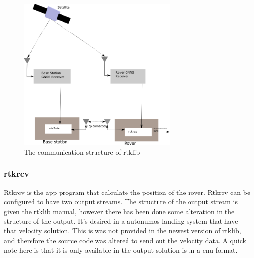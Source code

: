 \begin{figure}[H]
	\centering
		\includegraphics[width=0.7\textwidth]{figs/Rtklib_structure.png}
		\caption{The communication structure of rtklib}
		\label{figure:RTKLIB_STRUCTURE}
\end{figure}
\subsubsection{rtkrcv}
Rtkrcv is the app program that calculate the position of the rover.
Rtkrcv can be configured to have two output streams. The structure of the output stream is given the rtklib manual, however there has been done some alteration in the structure of the output. It's desired in a autonumos landing system that have that velocity solution. This is was not provided in the newest version of rtklib, and therefore the source code was altered to send out the velocity data. A quick note here is that it is only available in the output solution is in a enu format.

